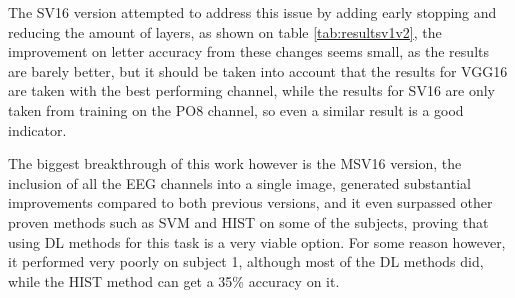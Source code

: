 \documentclass[conference]{IEEEtran}
\begin{document}
The SV16 version attempted to address this issue by adding early stopping and reducing the amount of layers, as shown on table \ref{tab:resultsv1v2}, the improvement on letter accuracy from these changes seems small, as the results are barely better, but it should be taken into account that the results for VGG16 are taken with the best performing channel, while the results for SV16 are only taken from training on the PO8 channel, so even a similar result is a good indicator.

The biggest breakthrough of this work however is the MSV16 version, the inclusion of all the EEG channels into a single image, generated substantial improvements compared to both previous versions, and it even surpassed other proven methods such as SVM and HIST on some of the subjects, proving that using DL methods for this task is a very viable option. For some reason however, it performed very poorly on subject 1, although most of the DL methods did, while the HIST method can get a 35\% accuracy on it.
\end{document}
